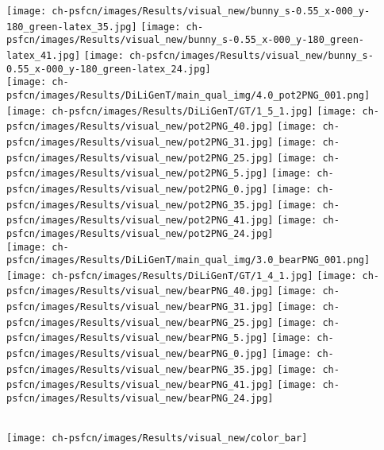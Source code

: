 \begin{minipage}{0.97\textwidth}
 \texttt{[image: ch-psfcn/images/Results/visual\_new/bunny\_s-0.55\_x-000\_y-180\_green-latex\_35.jpg]}
 \texttt{[image: ch-psfcn/images/Results/visual\_new/bunny\_s-0.55\_x-000\_y-180\_green-latex\_41.jpg]}
 \texttt{[image: ch-psfcn/images/Results/visual\_new/bunny\_s-0.55\_x-000\_y-180\_green-latex\_24.jpg]}
 \\
 \texttt{[image: ch-psfcn/images/Results/DiLiGenT/main\_qual\_img/4.0\_pot2PNG\_001.png]}
 \texttt{[image: ch-psfcn/images/Results/DiLiGenT/GT/1\_5\_1.jpg]}
 \texttt{[image: ch-psfcn/images/Results/visual\_new/pot2PNG\_40.jpg]}
 \texttt{[image: ch-psfcn/images/Results/visual\_new/pot2PNG\_31.jpg]}
 \texttt{[image: ch-psfcn/images/Results/visual\_new/pot2PNG\_25.jpg]}
 \texttt{[image: ch-psfcn/images/Results/visual\_new/pot2PNG\_5.jpg]}
 \texttt{[image: ch-psfcn/images/Results/visual\_new/pot2PNG\_0.jpg]}
 \texttt{[image: ch-psfcn/images/Results/visual\_new/pot2PNG\_35.jpg]}
 \texttt{[image: ch-psfcn/images/Results/visual\_new/pot2PNG\_41.jpg]}
 \texttt{[image: ch-psfcn/images/Results/visual\_new/pot2PNG\_24.jpg]}
 \\
 \texttt{[image: ch-psfcn/images/Results/DiLiGenT/main\_qual\_img/3.0\_bearPNG\_001.png]}
 \texttt{[image: ch-psfcn/images/Results/DiLiGenT/GT/1\_4\_1.jpg]}
 \texttt{[image: ch-psfcn/images/Results/visual\_new/bearPNG\_40.jpg]}
 \texttt{[image: ch-psfcn/images/Results/visual\_new/bearPNG\_31.jpg]}
 \texttt{[image: ch-psfcn/images/Results/visual\_new/bearPNG\_25.jpg]}
 \texttt{[image: ch-psfcn/images/Results/visual\_new/bearPNG\_5.jpg]}
 \texttt{[image: ch-psfcn/images/Results/visual\_new/bearPNG\_0.jpg]}
 \texttt{[image: ch-psfcn/images/Results/visual\_new/bearPNG\_35.jpg]}
 \texttt{[image: ch-psfcn/images/Results/visual\_new/bearPNG\_41.jpg]}
 \texttt{[image: ch-psfcn/images/Results/visual\_new/bearPNG\_24.jpg]}
\end{minipage} %
\begin{minipage}{0.012\textwidth}
     \centering
     \\
     \vspace{0.2em}
     \texttt{[image: ch-psfcn/images/Results/visual\_new/color\_bar]} \\
     \vspace{-0.4em}
\end{minipage}
